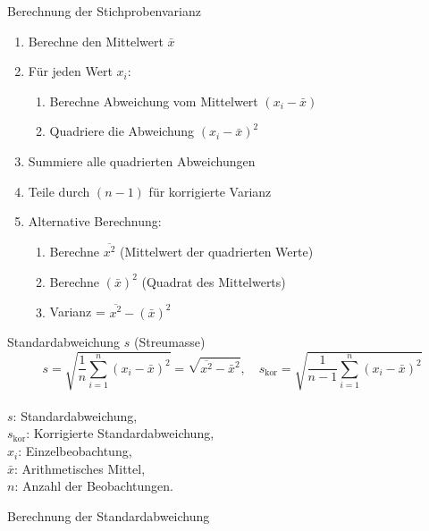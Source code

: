 \begin{KR}{Berechnung der Stichprobenvarianz}
\begin{enumerate}
    \item Berechne den Mittelwert $\bar{x}$
    \item Für jeden Wert $x_i$:
        \begin{enumerate}
            \item Berechne Abweichung vom Mittelwert $(x_i - \bar{x})$
            \item Quadriere die Abweichung $(x_i - \bar{x})^2$
        \end{enumerate}
    \item Summiere alle quadrierten Abweichungen
    \item Teile durch $(n-1)$ für korrigierte Varianz
    \item Alternative Berechnung:
        \begin{enumerate}
            \item Berechne $\overline{x^2}$ (Mittelwert der quadrierten Werte)
            \item Berechne $(\bar{x})^2$ (Quadrat des Mittelwerts)
            \item Varianz = $\overline{x^2} - (\bar{x})^2$
        \end{enumerate}
\end{enumerate}
\end{KR}

\begin{definition}{Standardabweichung $s$ (Streumasse)}
$$
s=\sqrt{\frac{1}{n} \sum_{i=1}^{n}\left(x_{i}-\bar{x}\right)^{2}}=\sqrt{\overline{x^{2}}-\bar{x}^{2}}, \quad s_{\text{kor}}=\sqrt{\frac{1}{n-1} \sum_{i=1}^{n}\left(x_{i}-\bar{x}\right)^{2}}
$$
\\
$s$: Standardabweichung, \\
$s_{\text{kor}}$: Korrigierte Standardabweichung, \\
$x_{i}$: Einzelbeobachtung, \\
$\bar{x}$: Arithmetisches Mittel, \\
$n$: Anzahl der Beobachtungen.
\end{definition}

\begin{KR}{Berechnung der Standardabweichung}
\end{KR}

